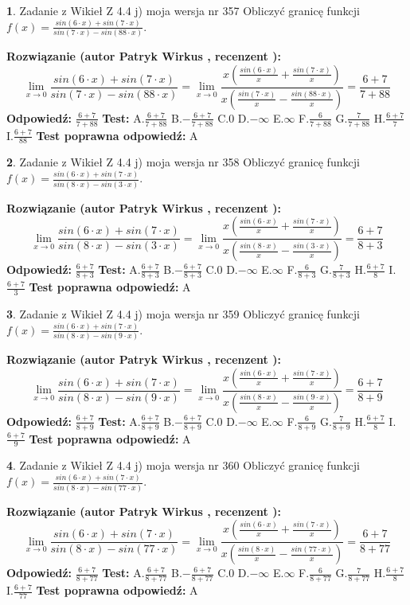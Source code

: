 \documentclass[12pt, a4paper]{article}
\theoremstyle{definition} %
\newtheorem{zad}{}
\newcommand{\zadStart}[1]{\begin{zad}#1\newline}
\newcommand{\zadStop}{\end{zad}}
\newcommand{\rozwStart}[2]{\noindent \textbf{Rozwiązanie (autor #1 , recenzent #2): }\newline}
\newcommand{\rozwStop}{\newline}
\newcommand{\odpStart}{\noindent \textbf{Odpowiedź:}\newline}
\newcommand{\odpStop}{\newline}
\newcommand{\testStart}{\noindent \textbf{Test:}\newline}
\newcommand{\testStop}{\newline}
\newcommand{\kluczStart}{\noindent \textbf{Test poprawna odpowiedź:}\newline}
\newcommand{\kluczStop}{\newline}
\begin{document}
\zadStart{Zadanie z Wikieł Z 4.4 j) moja wersja nr 357}
Obliczyć granicę funkcji $f(x)=\frac{sin(6\cdot x) +sin(7\cdot x)}{sin(7\cdot x) -sin(88\cdot x)}$.
\zadStop
\rozwStart{Patryk Wirkus}{}
$$\lim\limits_{x\to 0}\frac{sin(6\cdot x) +sin(7\cdot x)}{sin(7\cdot x) -sin(88\cdot x)}=\lim\limits_{x\to 0}\frac{x(\frac{sin(6\cdot x)}{x}+\frac{sin(7\cdot x)}{x})}{x(\frac{sin(7\cdot x)}{x}-\frac{sin(88\cdot x)}{x})}=\frac{6+7}{7+88}$$
\rozwStop
\odpStart
$\frac{6+7}{7+88}$
\odpStop
\testStart
A.$\frac{6+7}{7+88}$
B.$-\frac{6+7}{7+88}$
C.$0$
D.$-\infty$
E.$\infty$
F.$\frac{6}{7+88}$
G.$\frac{7}{7+88}$
H.$\frac{6+7}{7}$
I.$\frac{6+7}{88}$
\testStop
\kluczStart
A
\kluczStop



\zadStart{Zadanie z Wikieł Z 4.4 j) moja wersja nr 358}
Obliczyć granicę funkcji $f(x)=\frac{sin(6\cdot x) +sin(7\cdot x)}{sin(8\cdot x) -sin(3\cdot x)}$.
\zadStop
\rozwStart{Patryk Wirkus}{}
$$\lim\limits_{x\to 0}\frac{sin(6\cdot x) +sin(7\cdot x)}{sin(8\cdot x) -sin(3\cdot x)}=\lim\limits_{x\to 0}\frac{x(\frac{sin(6\cdot x)}{x}+\frac{sin(7\cdot x)}{x})}{x(\frac{sin(8\cdot x)}{x}-\frac{sin(3\cdot x)}{x})}=\frac{6+7}{8+3}$$
\rozwStop
\odpStart
$\frac{6+7}{8+3}$
\odpStop
\testStart
A.$\frac{6+7}{8+3}$
B.$-\frac{6+7}{8+3}$
C.$0$
D.$-\infty$
E.$\infty$
F.$\frac{6}{8+3}$
G.$\frac{7}{8+3}$
H.$\frac{6+7}{8}$
I.$\frac{6+7}{3}$
\testStop
\kluczStart
A
\kluczStop



\zadStart{Zadanie z Wikieł Z 4.4 j) moja wersja nr 359}
Obliczyć granicę funkcji $f(x)=\frac{sin(6\cdot x) +sin(7\cdot x)}{sin(8\cdot x) -sin(9\cdot x)}$.
\zadStop
\rozwStart{Patryk Wirkus}{}
$$\lim\limits_{x\to 0}\frac{sin(6\cdot x) +sin(7\cdot x)}{sin(8\cdot x) -sin(9\cdot x)}=\lim\limits_{x\to 0}\frac{x(\frac{sin(6\cdot x)}{x}+\frac{sin(7\cdot x)}{x})}{x(\frac{sin(8\cdot x)}{x}-\frac{sin(9\cdot x)}{x})}=\frac{6+7}{8+9}$$
\rozwStop
\odpStart
$\frac{6+7}{8+9}$
\odpStop
\testStart
A.$\frac{6+7}{8+9}$
B.$-\frac{6+7}{8+9}$
C.$0$
D.$-\infty$
E.$\infty$
F.$\frac{6}{8+9}$
G.$\frac{7}{8+9}$
H.$\frac{6+7}{8}$
I.$\frac{6+7}{9}$
\testStop
\kluczStart
A
\kluczStop



\zadStart{Zadanie z Wikieł Z 4.4 j) moja wersja nr 360}
Obliczyć granicę funkcji $f(x)=\frac{sin(6\cdot x) +sin(7\cdot x)}{sin(8\cdot x) -sin(77\cdot x)}$.
\zadStop
\rozwStart{Patryk Wirkus}{}
$$\lim\limits_{x\to 0}\frac{sin(6\cdot x) +sin(7\cdot x)}{sin(8\cdot x) -sin(77\cdot x)}=\lim\limits_{x\to 0}\frac{x(\frac{sin(6\cdot x)}{x}+\frac{sin(7\cdot x)}{x})}{x(\frac{sin(8\cdot x)}{x}-\frac{sin(77\cdot x)}{x})}=\frac{6+7}{8+77}$$
\rozwStop
\odpStart
$\frac{6+7}{8+77}$
\odpStop
\testStart
A.$\frac{6+7}{8+77}$
B.$-\frac{6+7}{8+77}$
C.$0$
D.$-\infty$
E.$\infty$
F.$\frac{6}{8+77}$
G.$\frac{7}{8+77}$
H.$\frac{6+7}{8}$
I.$\frac{6+7}{77}$
\testStop
\kluczStart
A
\kluczStop
\end{document}
